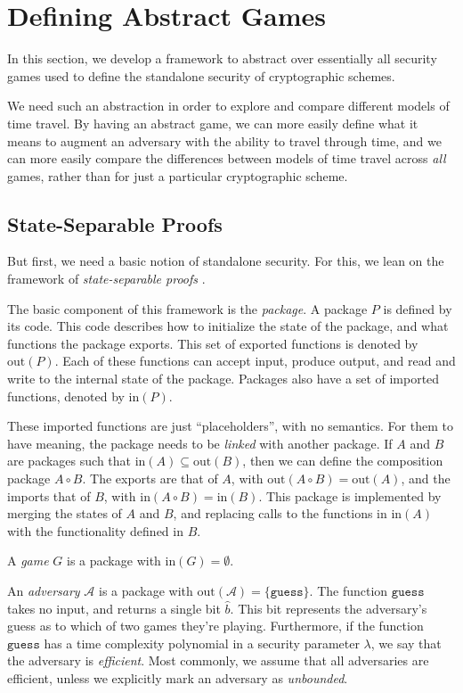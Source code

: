 \section{Defining Abstract Games}
\label{sec:abstract-game}

In this section, we develop a framework to abstract over essentially all
security games used to define the standalone security of cryptographic schemes.

We need such an abstraction in order to explore and compare different models
of time travel.
By having an abstract game, we can more easily define what it means to augment
an adversary with the ability to travel through time, and we can more easily
compare the differences between models of time travel across \emph{all}
games, rather than for just a particular cryptographic scheme.

\subsection{State-Separable Proofs}

But first, we need a basic notion of standalone security.
For this, we lean on the framework of \emph{state-separable proofs}
\cite{bdfkk18, mei22}.

The basic component of this framework is the \emph{package}.
A package $P$ is defined by its code.
This code describes how to initialize the state of the package, 
and what functions the package exports.
This set of exported functions is denoted by $\text{out}(P)$.
Each of these functions can accept input, produce output, and read and write
to the internal state of the package.
Packages also have a set of imported functions, denoted by $\text{in}(P)$.

These imported functions are just ``placeholders'', with no semantics.
For them to have meaning, the package needs to be \emph{linked} with another package.
If $A$ and $B$ are packages such that $\text{in}(A) \subseteq \text{out}(B)$,
then we can define the composition package $A \circ B$.
The exports are that of $A$, with $\text{out}(A \circ B) = \text{out}(A)$,
and the imports that of $B$, with $\text{in}(A \circ B) = \text{in}(B)$.
This package is implemented by merging the states of $A$ and $B$, and replacing
calls to the functions in $\text{in}(A)$ with the functionality defined in $B$.

A \emph{game} $G$ is a package with
$\text{in}(G) = \emptyset$.

An \emph{adversary} $\mathcal{A}$ is a package with $\text{out}(\mathcal{A}) = \{\texttt{guess}\}$.
The function $\texttt{guess}$ takes no input, and returns a single bit $\hat{b}$.
This bit represents the adversary's guess as to which of two games they're playing.
Furthermore, if the function $\texttt{guess}$ has a time complexity polynomial
in a security parameter $\lambda$, we say that the adversary is \emph{efficient}.
Most commonly, we assume that all adversaries are efficient, unless we explicitly
mark an adversary as \emph{unbounded}.

